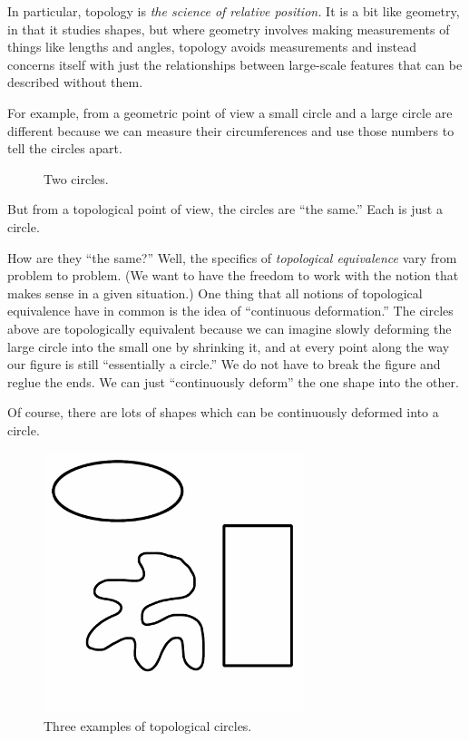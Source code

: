 \documentclass[12pt,letterpaper]{article}
\theoremstyle{definition}
\begin{document}
In particular, topology is \emph{the science of relative position.}
It is a bit like geometry, in that it studies shapes, but where geometry involves making measurements of things like lengths and angles, topology avoids measurements and instead concerns itself with just the relationships between large-scale features that can be described without them.

For example, from a geometric point of view a small circle and a large circle are different because we can measure their circumferences and use those numbers to tell the circles apart.

\begin{figure}[h]
\centering
{}
\caption{Two circles.}
\end{figure}


But from a topological point of view, the circles are ``the same.''
Each is just a circle.

How are they ``the same?''
Well, the specifics of \emph{topological equivalence} vary from problem to problem.
(We want to have the freedom to work with the notion that makes sense in a given situation.)
One thing that all notions of topological equivalence have in common is the idea of ``continuous deformation.''
The circles above are topologically equivalent because we can imagine slowly deforming the large circle into the small one by shrinking it, and at every point along the way our figure is still ``essentially a circle.''
We do not have to break the figure and reglue the ends.
We can just ``continuously deform'' the one shape into the other.

Of course, there are lots of shapes which can be continuously deformed into a circle.

\begin{figure}[h]
\centering
\includegraphics[height=3in]{phppics/topcircle.png}
\caption{Three examples of  topological circles.}
\end{figure}
\end{document}
